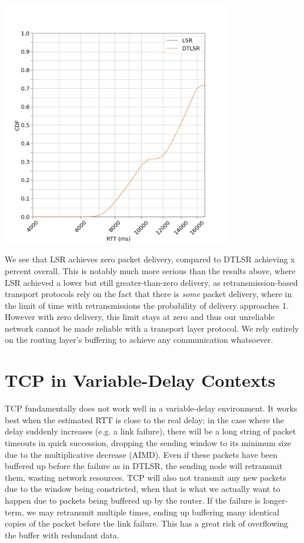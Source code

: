 \documentclass[withindex,glossary,openany]{cam-thesis}
\begin{document}
\begin{minipage}{1\textwidth} \centering
	\includegraphics[width=0.75\textwidth]{delay_full_partition_flap5}
\end{minipage}

We see that LSR achieves zero packet delivery, compared to DTLSR achieving x percent overall. This is notably much more serious than the results above, where LSR achieved a lower but still greater-than-zero delivery, as retransmission-based transport protocols rely on the fact that there is \textit{some} packet delivery, where in the limit of time with retransmissions the probability of delivery approaches 1. However with zero delivery, this limit stays at zero and thus our unreliable network cannot be made reliable with a transport layer protocol. We rely entirely on the routing layer's buffering to achieve any communication whatsoever.

\section{TCP in Variable-Delay Contexts}

TCP fundamentally does not work well in a variable-delay environment. It works best when the estimated RTT is close to the real delay; in the case where the delay suddenly increases (e.g. a link failure), there will be a long string of packet timeouts in quick succession, dropping the sending window to its minimum size due to the multiplicative decrease (AIMD). Even if these packets have been buffered up before the failure as in DTLSR, the sending node will retransmit them, wasting network resources. TCP will also not transmit any new packets due to the window being constricted, when that is what we actually want to happen due to packets being buffered up by the router. If the failure is longer-term, we may retransmit multiple times, ending up buffering many identical copies of the packet before the link failure. This has a great risk of overflowing the buffer with redundant data.
\end{document}
